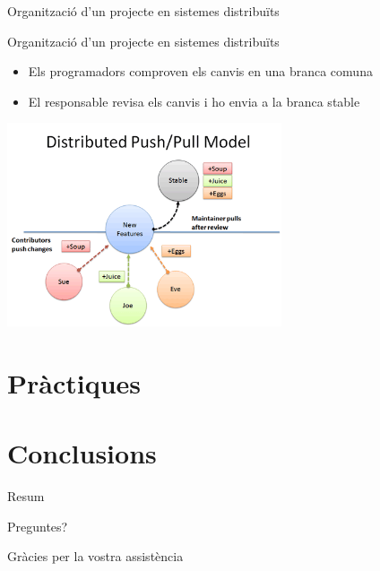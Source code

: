\documentclass[10pt,xcolor={rgb}]{beamer}
\begin{document}
    \begin{frame}[fragile]{Organització d'un projecte en sistemes distribuïts}
      
            \begin{block}{Organització d'un projecte en sistemes distribuïts}
      
              \begin{itemize}
                \item Els programadors comproven els canvis en una branca comuna
                \item El responsable revisa els canvis i ho envia a la branca stable
              \end{itemize}

              \centering
              \includegraphics[height=6cm]{distributed_push_pull.png}
      
            \end{block}
      
    \end{frame}  

    \section{Pràctiques}

    \section{Conclusions}
    
    \begin{frame}{Resum}
    
    \end{frame}
    
    \begin{frame}[standout]
      Preguntes?
    \end{frame}

    \begin{frame}{}
      Gràcies per la vostra assistència
    \end{frame}
    
\end{document}

